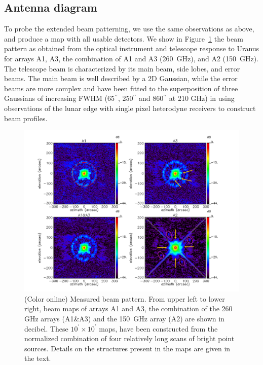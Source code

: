 \documentclass[]{aa} %
\begin{document}
\subsection{Antenna diagram}
\label{Antenna diagram}


To probe the extended beam patterning, we use the same observations as above, and produce a map with all usable detectors. We show in Figure~\ref{fig:beampattern} the beam pattern as obtained from the optical instrument and telescope response to Uranus for arrays A1, A3, the combination of A1 and A3 (260~GHz), and A2 (150~GHz). The telescope beam is characterized by its main beam, side lobes, and error beams. The main beam is well described by a 2D Gaussian, while the error beams are more complex and have been fitted to the superposition of three Gaussians of increasing FWHM (65$^{\prime \prime}$, 250$^{\prime \prime}$ and 860$^{\prime \prime}$ at 210 GHz) in \cite{greve1998,kramer2013} using observations of the lunar edge with single pixel heterodyne receivers to construct beam profiles.

\begin{figure}[h]
   \centering
    \includegraphics[width=1.00\linewidth]{Beams_features.pdf}  
      \caption{(Color online) Measured beam pattern. From upper left to lower right, beam maps of arrays A1 and A3, the combination of the 260 GHz arrays (A1\&A3) and the 150~GHz array (A2) are shown in decibel. These $10^{\prime} \times 10^{\prime}$ maps, have been constructed from the normalized combination of four relatively long scans of bright point sources. Details on the structures present in the maps are given in the text.}
         \label{fig:beampattern}
\end{figure}
\end{document}
